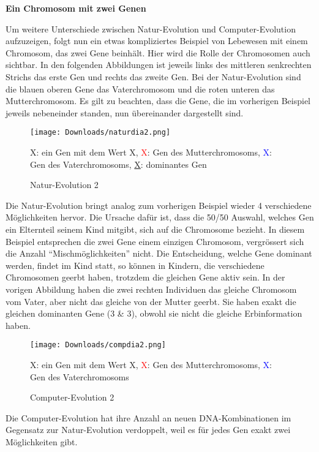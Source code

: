 \documentclass[10pt,a4paper,ngerman,english]{article}
\begin{document}
\vspace{10 em}

\textbf{Ein Chromosom mit zwei Genen}

\bigskip
Um weitere Unterschiede zwischen Natur-Evolution und Computer-Evolution aufzuzeigen, folgt nun ein etwas kompliziertes Beispiel von Lebewesen mit einem Chromosom, das zwei Gene beinhält. Hier wird die Rolle der Chromosomen auch sichtbar. In den folgenden Abbildungen ist jeweils links des mittleren senkrechten Strichs das erste Gen und rechts das zweite Gen. Bei der Natur-Evolution sind die blauen oberen Gene das Vaterchromosom und die roten unteren das Mutterchromosom. Es gilt zu beachten, dass die Gene, die im vorherigen Beispiel jeweils nebeneinder standen, nun übereinander dargestellt sind.

\begin{figure}[h]
    \centering
    \texttt{[image: Downloads/naturdia2.png]}
    \caption{Natur-Evolution 2}
    \medskip
    \scriptsize
    X: ein Gen mit dem Wert X, \textcolor{red}{X}: Gen des Mutterchromosoms, \textcolor{blue}{X}: Gen des Vaterchromosoms, \underline{X}: dominantes Gen
\end{figure}


Die Natur-Evolution bringt analog zum vorherigen Beispiel wieder 4 verschiedene Möglichkeiten hervor. Die Ursache dafür ist, dass die 50/50 Auswahl, welches Gen ein Elternteil seinem Kind mitgibt, sich auf die Chromosome bezieht. In diesem Beispiel entsprechen die zwei Gene einem einzigen Chromosom, vergrössert sich die Anzahl \enquote{Mischmöglichkeiten} nicht. Die Entscheidung, welche Gene dominant werden, findet im Kind statt, so können in Kindern, die verschiedene Chromosomen geerbt haben, trotzdem die gleichen Gene aktiv sein. In der vorigen Abbildung haben die zwei rechten Individuen das gleiche Chromosom vom Vater, aber nicht das gleiche von der Mutter geerbt. Sie haben exakt die gleichen dominanten Gene (3 \& 3), obwohl sie nicht die gleiche Erbinformation haben.

\begin{figure}[h]
    \centering
    \texttt{[image: Downloads/compdia2.png]}
    \caption{Computer-Evolution 2}
    \medskip
    \scriptsize
    X: ein Gen mit dem Wert X, \textcolor{red}{X}: Gen des Mutterchromosoms, \textcolor{blue}{X}: Gen des Vaterchromosoms
\end{figure}

Die Computer-Evolution hat ihre Anzahl an neuen DNA-Kombinationen im Gegensatz zur Natur-Evolution verdoppelt, weil es für jedes Gen exakt zwei Möglichkeiten gibt.
\end{document}
